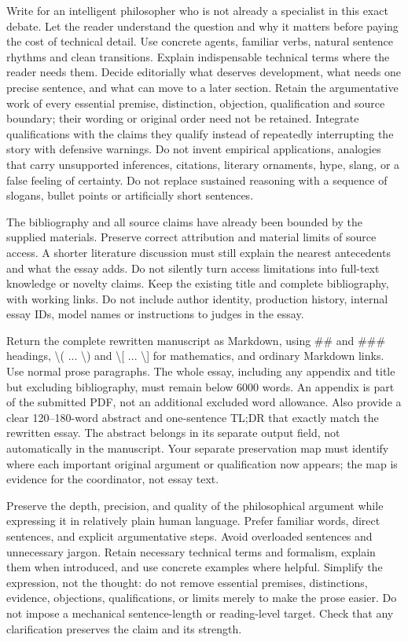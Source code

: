 Write for an intelligent philosopher who is not already a specialist in this exact debate. Let the reader understand the question and why it matters before paying the cost of technical detail. Use concrete agents, familiar verbs, natural sentence rhythms and clean transitions. Explain indispensable technical terms where the reader needs them. Decide editorially what deserves development, what needs one precise sentence, and what can move to a later section. Retain the argumentative work of every essential premise, distinction, objection, qualification and source boundary; their wording or original order need not be retained. Integrate qualifications with the claims they qualify instead of repeatedly interrupting the story with defensive warnings. Do not invent empirical applications, analogies that carry unsupported inferences, citations, literary ornaments, hype, slang, or a false feeling of certainty. Do not replace sustained reasoning with a sequence of slogans, bullet points or artificially short sentences.

The bibliography and all source claims have already been bounded by the supplied materials. Preserve correct attribution and material limits of source access. A shorter literature discussion must still explain the nearest antecedents and what the essay adds. Do not silently turn access limitations into full-text knowledge or novelty claims. Keep the existing title and complete bibliography, with working links. Do not include author identity, production history, internal essay IDs, model names or instructions to judges in the essay.

Return the complete rewritten manuscript as Markdown, using \#\# and \#\#\# headings, \textbackslash{}( ... \textbackslash{}) and \textbackslash{}[ ... \textbackslash{}] for mathematics, and ordinary Markdown links. Use normal prose paragraphs. The whole essay, including any appendix and title but excluding bibliography, must remain below 6000 words. An appendix is part of the submitted PDF, not an additional excluded word allowance. Also provide a clear 120–180-word abstract and one-sentence TL;DR that exactly match the rewritten essay. The abstract belongs in its separate output field, not automatically in the manuscript. Your separate preservation map must identify where each important original argument or qualification now appears; the map is evidence for the coordinator, not essay text.

Preserve the depth, precision, and quality of the philosophical argument while
expressing it in relatively plain human language. Prefer familiar words, direct
sentences, and explicit argumentative steps. Avoid overloaded sentences and
unnecessary jargon. Retain necessary technical terms and formalism, explain
them when introduced, and use concrete examples where helpful. Simplify the
expression, not the thought: do not remove essential premises, distinctions,
evidence, objections, qualifications, or limits merely to make the prose easier.
Do not impose a mechanical sentence-length or reading-level target. Check that
any clarification preserves the claim and its strength.


